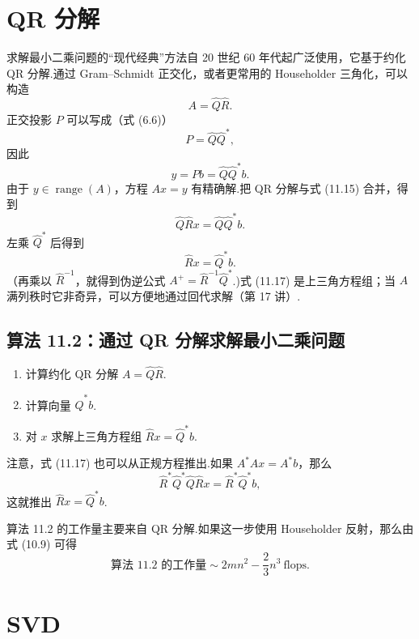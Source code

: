 \documentclass[UTF8,fontset=none,12pt]{ctexart}
\newcommand{\range}{\operatorname{range}}
\theoremstyle{definition}
\begin{document}
\section*{QR 分解}

求解最小二乘问题的“现代经典”方法自 20 世纪 60 年代起广泛使用，它基于约化 QR 分解.通过 Gram--Schmidt 正交化，或者更常用的 Householder 三角化，可以构造
\[
    A=\widehat Q\widehat R.
\]
正交投影 $P$ 可以写成（式 (6.6)）
\[
    P=\widehat Q\widehat Q^*,
\]
因此
\begin{equation}
    y=Pb=\widehat Q\widehat Q^*b.
    \tag{11.15}
\end{equation}
由于 $y\in\range(A)$，方程 $Ax=y$ 有精确解.把 QR 分解与式 (11.15) 合并，得到
\begin{equation}
    \widehat Q\widehat R x=\widehat Q\widehat Q^*b.
    \tag{11.16}
\end{equation}
左乘 $\widehat Q^*$ 后得到
\begin{equation}
    \widehat R x=\widehat Q^*b.
    \tag{11.17}
\end{equation}
（再乘以 $\widehat R^{-1}$，就得到伪逆公式 $A^+=\widehat R^{-1}\widehat Q^*$.)式 (11.17) 是上三角方程组；当 $A$ 满列秩时它非奇异，可以方便地通过回代求解（第 17 讲）.

\subsection*{算法 11.2：通过 QR 分解求解最小二乘问题}

\begin{enumerate}
    \item 计算约化 QR 分解 $A=\widehat Q\widehat R$.
    \item 计算向量 $\widehat Q^*b$.
    \item 对 $x$ 求解上三角方程组 $\widehat R x=\widehat Q^*b$.
\end{enumerate}

注意，式 (11.17) 也可以从正规方程推出.如果 $A^*Ax=A^*b$，那么
\[
    \widehat R^*\widehat Q^*\widehat Q\widehat R x
    =\widehat R^*\widehat Q^*b,
\]
这就推出 $\widehat R x=\widehat Q^*b$.

算法 11.2 的工作量主要来自 QR 分解.如果这一步使用 Householder 反射，那么由式 (10.9) 可得
\begin{equation}
    \text{算法 11.2 的工作量}\sim 2mn^2-\frac23n^3\ \text{flops}.
    \tag{11.18}
\end{equation}

\section*{SVD}
\end{document}

